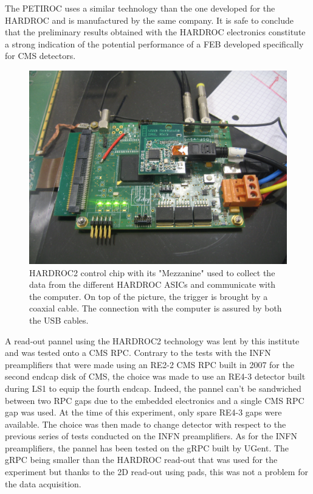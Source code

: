 	The PETIROC uses a similar technology than the one developed for the HARDROC and is manufactured by the same company. It is safe to conclude that the preliminary results obtained with the HARDROC electronics constitute a strong indication of the potential performance of a FEB developed specifically for CMS detectors.
	
\begingroup\setlength{\intextsep}{5pt}\setlength{\columnsep}{15pt}

	\begin{figure}
	    \centering
		\includegraphics[width = \linewidth]{fig/chapt6/HARDROC_chip.JPG}
		\caption{\label{fig:HARDROC2-chip} HARDROC2 control chip with its "Mezzanine" used to collect the data from the different HARDROC ASICs and communicate with the computer. On top of the picture, the trigger is brought by a coaxial cable. The connection with the computer is assured by both the USB cables.}
    \end{figure}
	
	A read-out pannel using the HARDROC2 technology was lent by this institute and was tested onto a CMS RPC. Contrary to the tests with the INFN preamplifiers that were made using an RE2-2 CMS RPC built in 2007 for the second endcap disk of CMS, the choice was made to use an RE4-3 detector built during LS1 to equip the fourth endcap. Indeed, the pannel can't be sandwiched between two RPC gaps due to the embedded electronics and a single CMS RPC gap was used. At the time of this experiment, only spare RE4-3 gaps were available. The choice was then made to change detector with respect to the previous series of tests conducted on the INFN preamplifiers. As for the INFN preamplifiers, the pannel has been tested on the gRPC built by UGent. The gRPC being smaller than the HARDROC read-out that was used for the experiment but thanks to the 2D read-out using pads, this was not a problem for the data acquisition.
	

